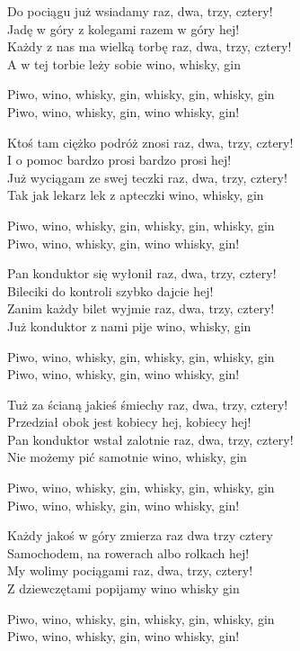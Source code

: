 \begin{text}
    Do pociągu już wsiadamy raz, dwa, trzy, cztery!\\
    Jadę w góry z kolegami razem w góry hej!\\
    Każdy z nas ma wielką torbę raz, dwa, trzy, cztery!\\
    A w tej torbie leży sobie wino, whisky, gin

    \vin Piwo, wino, whisky, gin, whisky, gin, whisky, gin\\
    \vin Piwo, wino, whisky, gin, wino whisky, gin!

    Ktoś tam ciężko podróż znosi raz, dwa, trzy, cztery!\\
    I o pomoc bardzo prosi bardzo prosi hej!\\
    Już wyciągam ze swej teczki raz, dwa, trzy, cztery!\\
    Tak jak lekarz lek z apteczki wino, whisky, gin

    \vin Piwo, wino, whisky, gin, whisky, gin, whisky, gin\\
    \vin Piwo, wino, whisky, gin, wino whisky, gin!

    Pan konduktor się wyłonił raz, dwa, trzy, cztery!\\
    Bileciki do kontroli szybko dajcie hej!\\
    Zanim każdy bilet wyjmie raz, dwa, trzy, cztery!\\
    Już konduktor z nami pije wino, whisky, gin

    \vin Piwo, wino, whisky, gin, whisky, gin, whisky, gin\\
    \vin Piwo, wino, whisky, gin, wino whisky, gin!

    Tuż za ścianą jakieś śmiechy raz, dwa, trzy, cztery!\\
    Przedział obok jest kobiecy hej, kobiecy hej!\\
    Pan konduktor wstał zalotnie raz, dwa, trzy, cztery!\\
    Nie możemy pić samotnie wino, whisky, gin

    \vin Piwo, wino, whisky, gin, whisky, gin, whisky, gin\\
    \vin Piwo, wino, whisky, gin, wino whisky, gin!

    Każdy jakoś w góry zmierza raz dwa trzy cztery\\
    Samochodem, na rowerach albo rolkach hej!\\
    My wolimy pociągami raz, dwa, trzy, cztery!\\
    Z dziewczętami popijamy wino whisky gin

    \vin Piwo, wino, whisky, gin, whisky, gin, whisky, gin\\
    \vin Piwo, wino, whisky, gin, wino whisky, gin!

\end{text}
